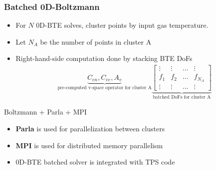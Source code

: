 \documentclass[mathserif, aspectratio=169]{beamer}
\begin{document}
\begin{frame}
	\frametitle{Batched 0D-Boltzmann}
	\begin{itemize}
		\item For $N$ 0D-BTE solves, cluster points by input gas temperature. 
		\item Let $N_A$ be the number of points in cluster A
		\item Right-hand-side computation done by stacking BTE DoFs 
		\begin{align*}
			\underbrace{C_{en}, C_{ee}, A_{v}}_{\text{pre-computed v-space operator for cluster A}} \underbrace{\begin{bmatrix}
				\vdots & \vdots & \hdots &\vdots\\
				f_1    & f_2    & \hdots & f_{N_A} \\
				\vdots & \vdots & \hdots &\vdots
			\end{bmatrix}}_{\text{batched DoFs for cluster A}}
		\end{align*}
	\end{itemize}
	Boltzmann + Parla + MPI
	\begin{itemize}
		\item \textbf{Parla} is used for parallelization between clusters
		\item \textbf{MPI} is used for distributed memory parallelism
		\item 0D-BTE batched solver is integrated with TPS code
	\end{itemize}
\end{frame}
\end{document}
